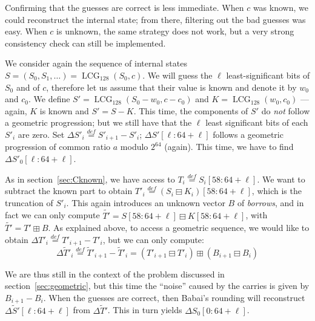 \documentclass[submission,svgnames,journal=tosc]{iacrtrans}
\DeclareMathOperator{\LCG}{LCG}
\begin{document}
Confirming that the guesses are correct is less immediate. When $c$ was known,
we could reconstruct the internal state; from there, filtering out the bad
guesses was easy. When $c$ is unknown, the same strategy does not work, but a
very strong consistency check can still be implemented. %

We consider again the sequence of internal states
$S = (S_0, S_1, \dots) = \LCG_{128}(S_0, c)$. We will guess the $\ell$
least-significant bits of $S_0$ and of $c$, therefore let us assume that their
value is known and denote it by $w_0$ and $c_0$. We define
$S' = \LCG_{128}(S_0 - w_0, c - c_0)$ and $K = \LCG_{128}(w_0, c_0)$ --- again,
$K$ is known and $S' = S - K$. This time, the components of $S'$ do \emph{not}
follow a geometric progression; but we still have that the $\ell$ least
significant bits of each $S'_i$ are zero. Set
$\Delta S'_i \stackrel{def}{=} S'_{i+1} - S'_i$; $\Delta S'[\ell:64+\ell]$
follows a geometric progression of common ratio $a$ modulo $2^{64}$
(again). This time, we have to find $\Delta S'_0[\ell:64+\ell]$.

As in section~\ref{sec:Cknown}, we have access to
$T_i \stackrel{def}{=} S_i[58:64+\ell]$. We want to subtract the known part to
obtain $T'_i \stackrel{def}{=} (S_i \boxminus K_i)[58:64+\ell]$, which is the
truncation of $S'_i$. This again introduces an unknown vector $B$ of
\emph{borrows}, and in fact we can only compute
$\widetilde{T'} = S[58:64+\ell] \boxminus K[58:64+\ell]$, with
$\widetilde{T'} = T' \boxplus B$. As explained above, to access a geometric
sequence, we would like to obtain
$\Delta T'_i \stackrel{def}{=} T'_{i+1} - T'_i$, but we can only compute:
\[
  \Delta \widetilde{T}'_i \stackrel{def}{=} \widetilde{T}'_{i+1} - \widetilde{T}'_i
  =  (T'_{i+1} \boxminus T'_{i}) \boxplus (B_{i+1} \boxminus B_{i})
\]

We are thus still in the context of the problem discussed in
section~\ref{sec:geometric}, but this time the ``noise'' caused by the carries
is given by $B_{i+1} - B_i$. When the guesses are correct, then Babai's rounding
will reconstruct $\Delta \widetilde{S}'[\ell:64+\ell]$ from
$\Delta \widetilde{T}'$. This in turn yields $\Delta S_0[0:64+\ell]$.
\end{document}
